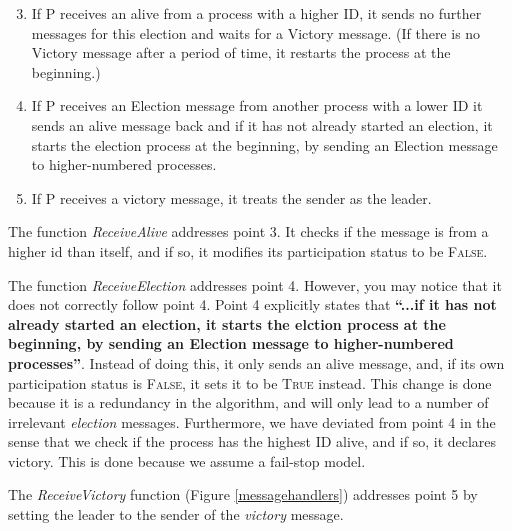 \documentclass{report}
\begin{document}
\begin{enumerate}
  \setcounter{enumi}{2}
  \item If P receives an alive from a process with a higher ID, it sends no further messages for this election and waits for a Victory message. (If there is no Victory message after a period of time, it restarts the process at the beginning.)
  \item If P receives an Election message from another process with a lower ID it sends an alive message back and if it has not already started an election, it starts the election process at the beginning, by sending an Election message to higher-numbered processes.
  \item If P receives a victory message, it treats the sender as the leader.
\end{enumerate}

The function \textit{ReceiveAlive} addresses point 3. It checks if the message is from a higher id than itself, and if so, it modifies its participation status to be \textsc{False}.

The function \textit{ReceiveElection} addresses point 4. However, you may notice that it does not correctly follow point 4. Point 4 explicitly states that \textbf{``...if it has not already started an election, it starts the elction process at the beginning, by sending an Election message to higher-numbered processes''}. Instead of doing this, it only sends an alive message, and, if its own participation status is \textsc{False}, it sets it to be \textsc{True} instead. This change is done because it is a redundancy in the algorithm, and will only lead to a number of irrelevant \textit{election} messages. Furthermore, we have deviated from point 4 in the sense that we check if the process has the highest ID alive, and if so, it declares victory. This is done because we assume a fail-stop model.

The \textit{ReceiveVictory} function (Figure \ref{messagehandlers}) addresses point 5 by setting the leader to the sender of the \textit{victory} message.
\end{document}

